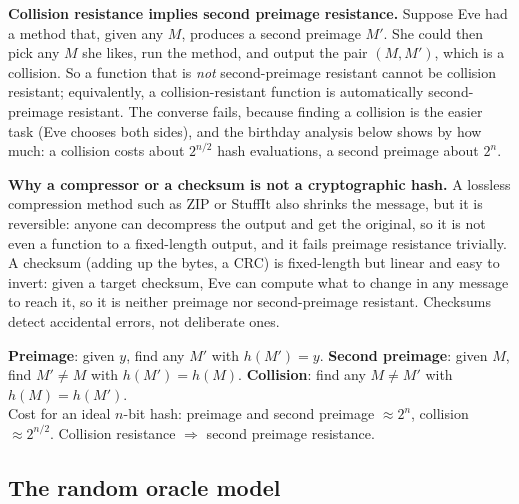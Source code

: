 \textbf{Collision resistance implies second preimage resistance.} Suppose Eve had a method that, given any $M$, produces a second preimage $M'$. She could then pick any $M$ she likes, run the method, and output the pair $(M, M')$, which is a collision. So a function that is \emph{not} second-preimage resistant cannot be collision resistant; equivalently, a collision-resistant function is automatically second-preimage resistant. The converse fails, because finding a collision is the easier task (Eve chooses both sides), and the birthday analysis below shows by how much: a collision costs about $2^{n/2}$ hash evaluations, a second preimage about $2^n$.

\textbf{Why a compressor or a checksum is not a cryptographic hash.} A lossless compression method such as ZIP or StuffIt also shrinks the message, but it is reversible: anyone can decompress the output and get the original, so it is not even a function to a fixed-length output, and it fails preimage resistance trivially. A checksum (adding up the bytes, a CRC) is fixed-length but linear and easy to invert: given a target checksum, Eve can compute what to change in any message to reach it, so it is neither preimage nor second-preimage resistant. Checksums detect accidental errors, not deliberate ones.

\begin{mustknow}
\textbf{Preimage}: given $y$, find any $M'$ with $h(M') = y$. \quad \textbf{Second preimage}: given $M$, find $M' \ne M$ with $h(M') = h(M)$. \quad \textbf{Collision}: find any $M \ne M'$ with $h(M) = h(M')$.\\
Cost for an ideal $n$-bit hash: preimage and second preimage $\approx 2^n$, collision $\approx 2^{n/2}$. Collision resistance $\Rightarrow$ second preimage resistance.
\end{mustknow}

\subsection{The random oracle model \new}


